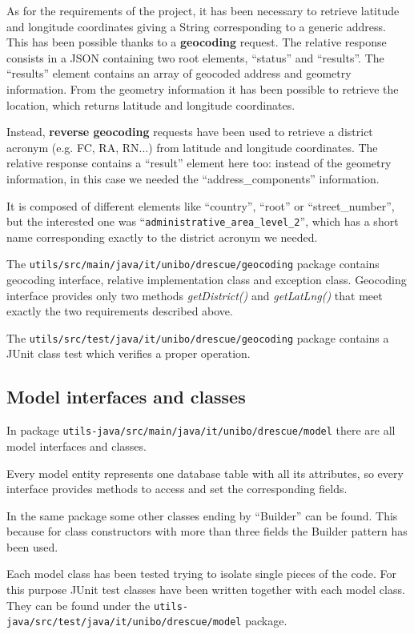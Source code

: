 \documentclass[a4paper,12pt]{report}
\begin{document}
As for the requirements of the project, it has been necessary to retrieve latitude and longitude coordinates giving a String corresponding to a generic address. This has been possible thanks to a \textbf{geocoding} request. The relative response consists in a JSON containing two root elements, ``status'' and ``results''. The ``results'' element contains an array of geocoded address and geometry information. From the geometry information it has been possible to retrieve the location, which returns latitude and longitude coordinates. 

Instead, \textbf{reverse geocoding} requests have been used to retrieve a district acronym (e.g. FC, RA, RN...) from latitude and longitude coordinates. The relative response contains a ``result'' element here too: instead of the geometry information, in this case we needed the ``address\_components'' information. 

It is composed of different elements like ``country'', ``root'' or ``street\_number'', but the interested one was ``\texttt{administrative\_area\_level\_2}'', which has a short name corresponding exactly to the district acronym we needed.

The \texttt{utils/src/main/java/it/unibo/drescue/geocoding} package contains geocoding interface, relative implementation class and exception class. Geocoding interface provides only two methods \emph{getDistrict()} and \emph{getLatLng()} that meet exactly the two requirements described above.

The \texttt{utils/src/test/java/it/unibo/drescue/geocoding} package contains a JUnit class test which verifies a proper operation.

\subsection{Model interfaces and classes}
In package \texttt{utils-java/src/main/java/it/unibo/drescue/model} there are all model interfaces and classes.

Every model entity represents one database table with all its attributes, so every interface provides methods to access and set the corresponding fields.

In the same package some other classes ending by ``Builder'' can be found. This because for class constructors with more than three fields the Builder pattern has been used.

Each model class has been tested trying to isolate single pieces of the code. For this purpose JUnit test classes have been written together with each model class. They can be found under the \texttt{utils-java/src/test/java/it/unibo/drescue/model} package.
\end{document}
